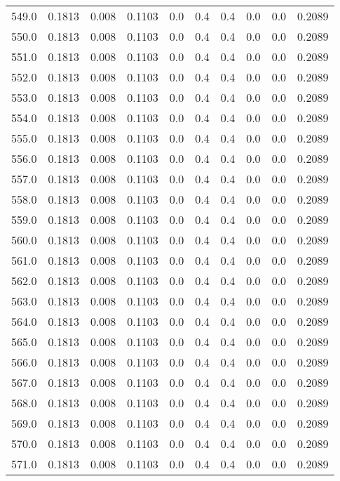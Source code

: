 \begin{longtable}{lrrrrrrrrr}
549.0 & 0.1813 & 0.008 & 0.1103 & 0.0 & 0.4 & 0.4 & 0.0 & 0.0 & 0.2089 \\
550.0 & 0.1813 & 0.008 & 0.1103 & 0.0 & 0.4 & 0.4 & 0.0 & 0.0 & 0.2089 \\
551.0 & 0.1813 & 0.008 & 0.1103 & 0.0 & 0.4 & 0.4 & 0.0 & 0.0 & 0.2089 \\
552.0 & 0.1813 & 0.008 & 0.1103 & 0.0 & 0.4 & 0.4 & 0.0 & 0.0 & 0.2089 \\
553.0 & 0.1813 & 0.008 & 0.1103 & 0.0 & 0.4 & 0.4 & 0.0 & 0.0 & 0.2089 \\
554.0 & 0.1813 & 0.008 & 0.1103 & 0.0 & 0.4 & 0.4 & 0.0 & 0.0 & 0.2089 \\
555.0 & 0.1813 & 0.008 & 0.1103 & 0.0 & 0.4 & 0.4 & 0.0 & 0.0 & 0.2089 \\
556.0 & 0.1813 & 0.008 & 0.1103 & 0.0 & 0.4 & 0.4 & 0.0 & 0.0 & 0.2089 \\
557.0 & 0.1813 & 0.008 & 0.1103 & 0.0 & 0.4 & 0.4 & 0.0 & 0.0 & 0.2089 \\
558.0 & 0.1813 & 0.008 & 0.1103 & 0.0 & 0.4 & 0.4 & 0.0 & 0.0 & 0.2089 \\
559.0 & 0.1813 & 0.008 & 0.1103 & 0.0 & 0.4 & 0.4 & 0.0 & 0.0 & 0.2089 \\
560.0 & 0.1813 & 0.008 & 0.1103 & 0.0 & 0.4 & 0.4 & 0.0 & 0.0 & 0.2089 \\
561.0 & 0.1813 & 0.008 & 0.1103 & 0.0 & 0.4 & 0.4 & 0.0 & 0.0 & 0.2089 \\
562.0 & 0.1813 & 0.008 & 0.1103 & 0.0 & 0.4 & 0.4 & 0.0 & 0.0 & 0.2089 \\
563.0 & 0.1813 & 0.008 & 0.1103 & 0.0 & 0.4 & 0.4 & 0.0 & 0.0 & 0.2089 \\
564.0 & 0.1813 & 0.008 & 0.1103 & 0.0 & 0.4 & 0.4 & 0.0 & 0.0 & 0.2089 \\
565.0 & 0.1813 & 0.008 & 0.1103 & 0.0 & 0.4 & 0.4 & 0.0 & 0.0 & 0.2089 \\
566.0 & 0.1813 & 0.008 & 0.1103 & 0.0 & 0.4 & 0.4 & 0.0 & 0.0 & 0.2089 \\
567.0 & 0.1813 & 0.008 & 0.1103 & 0.0 & 0.4 & 0.4 & 0.0 & 0.0 & 0.2089 \\
568.0 & 0.1813 & 0.008 & 0.1103 & 0.0 & 0.4 & 0.4 & 0.0 & 0.0 & 0.2089 \\
569.0 & 0.1813 & 0.008 & 0.1103 & 0.0 & 0.4 & 0.4 & 0.0 & 0.0 & 0.2089 \\
570.0 & 0.1813 & 0.008 & 0.1103 & 0.0 & 0.4 & 0.4 & 0.0 & 0.0 & 0.2089 \\
571.0 & 0.1813 & 0.008 & 0.1103 & 0.0 & 0.4 & 0.4 & 0.0 & 0.0 & 0.2089 \\

\end{longtable}
